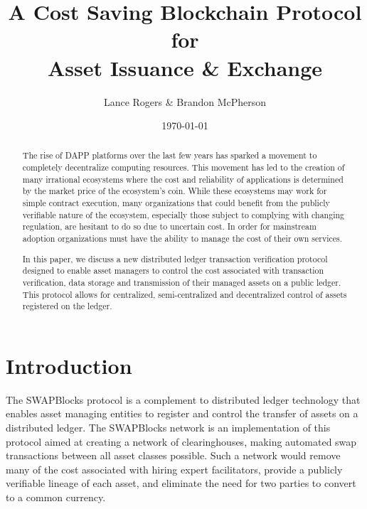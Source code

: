 \documentclass[12pt]{article}
\title{A Cost Saving Blockchain Protocol for\\
Asset Issuance \& Exchange}
\author{Lance Rogers \& Brandon McPherson}
\date{\today}
\begin{document}
\maketitle

\begin{abstract}
	

	
	
The rise of DAPP platforms over the last few years has sparked a movement to 
completely decentralize computing resources.  This movement has led to 
the creation of many irrational ecosystems where the cost and reliability of
applications is determined by the market price of the ecosystem's coin. %
While these ecosystems may work for simple contract execution,
many organizations that could benefit from the publicly verifiable nature of the
ecosystem, especially those subject to complying with changing regulation,
	are hesitant to do so due to uncertain cost. 
In order for mainstream adoption organizations must have the ability to manage
the cost of their own services.

In this paper, we discuss a new distributed ledger transaction verification
protocol designed to enable asset managers to control the cost associated with
transaction verification, data storage and transmission of their managed assets on 
	a public ledger.
This protocol allows for centralized, semi-centralized 
and decentralized control of assets registered on the ledger. 


\end{abstract}

\pagebreak

\tableofcontents

\pagebreak

\section{Introduction}



The SWAPBlocks protocol is a complement to distributed ledger technology that enables
asset managing entities to register and control the transfer of assets on a distributed
ledger.  The SWAPBlocks network is an implementation of this protocol aimed at creating a network
of clearinghouses, making automated swap transactions between all asset classes possible.  Such a network
would remove many of the cost associated with hiring expert facilitators, provide a publicly verifiable
lineage of each asset, and eliminate the need for two parties to convert to a common currency.
\end{document}
